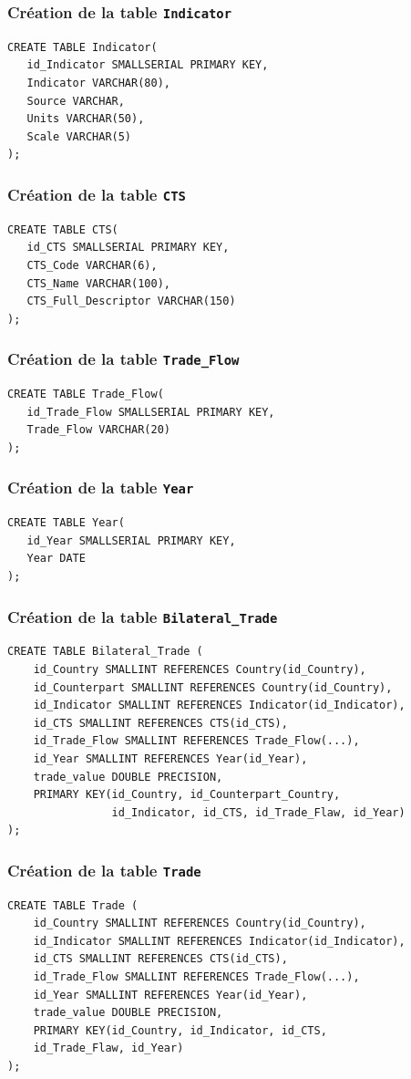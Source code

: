 \documentclass[11pt]{beamer}
\begin{document}
\begin{frame}[fragile]
  \frametitle{Création de la table \texttt{Indicator}}
\begin{verbatim}
CREATE TABLE Indicator(
   id_Indicator SMALLSERIAL PRIMARY KEY,
   Indicator VARCHAR(80),
   Source VARCHAR,
   Units VARCHAR(50),
   Scale VARCHAR(5)
);
\end{verbatim}
\end{frame}

\begin{frame}[fragile]
  \frametitle{Création de la table \texttt{CTS}}
\begin{verbatim}
CREATE TABLE CTS(
   id_CTS SMALLSERIAL PRIMARY KEY,
   CTS_Code VARCHAR(6),
   CTS_Name VARCHAR(100),
   CTS_Full_Descriptor VARCHAR(150)
);
\end{verbatim}
\end{frame}

\begin{frame}[fragile]
  \frametitle{Création de la table \texttt{Trade\_Flow}}
\begin{verbatim}
CREATE TABLE Trade_Flow(
   id_Trade_Flow SMALLSERIAL PRIMARY KEY,
   Trade_Flow VARCHAR(20)
);
\end{verbatim}
\end{frame}

\begin{frame}[fragile]
  \frametitle{Création de la table \texttt{Year}}
\begin{verbatim}
CREATE TABLE Year(
   id_Year SMALLSERIAL PRIMARY KEY,
   Year DATE
);
\end{verbatim}
\end{frame}

\begin{frame}[fragile]
  \frametitle{Création de la table \texttt{Bilateral\_Trade}}
\begin{verbatim}
CREATE TABLE Bilateral_Trade (
    id_Country SMALLINT REFERENCES Country(id_Country),
    id_Counterpart SMALLINT REFERENCES Country(id_Country),
    id_Indicator SMALLINT REFERENCES Indicator(id_Indicator),
    id_CTS SMALLINT REFERENCES CTS(id_CTS),
    id_Trade_Flow SMALLINT REFERENCES Trade_Flow(...),
    id_Year SMALLINT REFERENCES Year(id_Year),
    trade_value DOUBLE PRECISION,
    PRIMARY KEY(id_Country, id_Counterpart_Country,
                id_Indicator, id_CTS, id_Trade_Flaw, id_Year)
);
\end{verbatim}
\end{frame}

\begin{frame}[fragile]
  \frametitle{Création de la table \texttt{Trade}}
\begin{verbatim}
CREATE TABLE Trade (
    id_Country SMALLINT REFERENCES Country(id_Country),
    id_Indicator SMALLINT REFERENCES Indicator(id_Indicator),
    id_CTS SMALLINT REFERENCES CTS(id_CTS),
    id_Trade_Flow SMALLINT REFERENCES Trade_Flow(...),
    id_Year SMALLINT REFERENCES Year(id_Year),
    trade_value DOUBLE PRECISION,
    PRIMARY KEY(id_Country, id_Indicator, id_CTS, 
    id_Trade_Flaw, id_Year)
);
\end{verbatim}
\end{frame}
\end{document}
